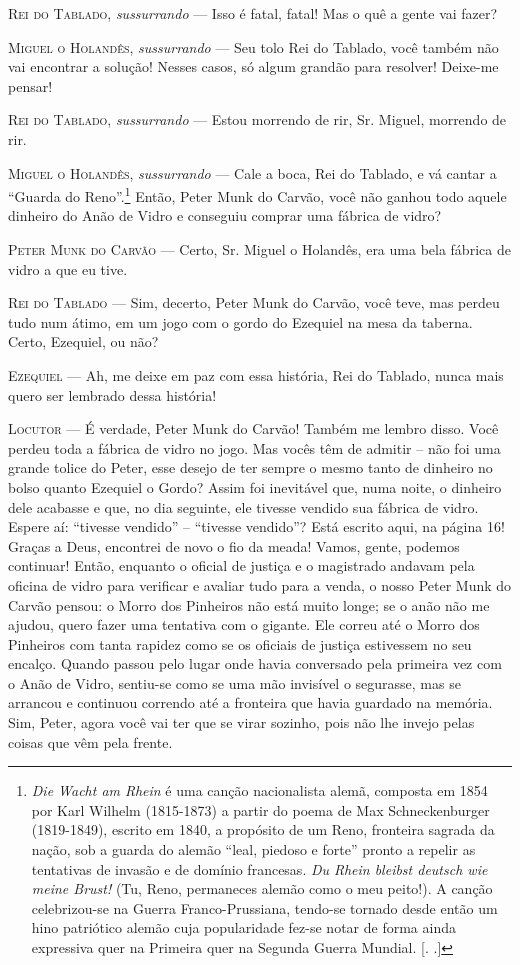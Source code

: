 \textsc{Rei do Tablado}, \emph{sussurrando} --- Isso é fatal, fatal! Mas o quê a
gente vai fazer?

\textsc{Miguel o Holandês}, \emph{sussurrando} --- Seu tolo Rei do Tablado, você
também não vai encontrar a solução! Nesses casos, só algum grandão para
resolver! Deixe-me pensar!

\textsc{Rei do Tablado}, \emph{sussurrando} --- Estou morrendo de rir, Sr. Miguel,
morrendo de rir.

\textsc{Miguel o Holandês}, \emph{sussurrando} --- Cale a boca, Rei do Tablado, e
vá cantar a ``Guarda do Reno''.\footnote{\emph{Die Wacht am Rhein} é uma
  canção nacionalista alemã, composta em 1854 por Karl Wilhelm
  (1815-1873) a partir do poema de Max Schneckenburger (1819-1849),
  escrito em 1840, a propósito de um Reno, fronteira sagrada da nação,
  sob a guarda do alemão ``leal, piedoso e forte'' pronto a repelir as
  tentativas de invasão e de domínio francesas. \emph{Du Rhein bleibst
  deutsch wie meine Brust!} (Tu, Reno, permaneces alemão como o meu
  peito!). A canção celebrizou-se na Guerra Franco-Prussiana, tendo-se
  tornado desde então um hino patriótico alemão cuja popularidade fez-se
  notar de forma ainda expressiva quer na Primeira quer na Segunda
  Guerra Mundial. [. .]} Então, Peter Munk do Carvão, você não
ganhou todo aquele dinheiro do Anão de Vidro e conseguiu comprar uma
fábrica de vidro?

\textsc{Peter Munk do Carvão} --- Certo, Sr. Miguel o Holandês, era uma bela
fábrica de vidro a que eu tive.

\textsc{Rei do Tablado} --- Sim, decerto, Peter Munk do Carvão, você teve, mas
perdeu tudo num átimo, em um jogo com o gordo do Ezequiel na mesa da
taberna. Certo, Ezequiel, ou não?

\textsc{Ezequiel} --- Ah, me deixe em paz com essa história, Rei do Tablado, nunca
mais quero ser lembrado dessa história!

\textsc{Locutor} --- É verdade, Peter Munk do Carvão! Também me lembro disso. Você
perdeu toda a fábrica de vidro no jogo. Mas vocês têm de admitir -- não
foi uma grande tolice do Peter, esse desejo de ter sempre o mesmo tanto
de dinheiro no bolso quanto Ezequiel o Gordo? Assim foi inevitável que,
numa noite, o dinheiro dele acabasse e que, no dia seguinte, ele tivesse
vendido sua fábrica de vidro. Espere aí: ``tivesse vendido'' --
``tivesse vendido''? Está escrito aqui, na página 16! Graças a Deus,
encontrei de novo o fio da meada! Vamos, gente, podemos continuar!
Então, enquanto o oficial de justiça e o magistrado andavam pela oficina
de vidro para verificar e avaliar tudo para a venda, o nosso Peter Munk
do Carvão pensou: o Morro dos Pinheiros não está muito longe; se o anão
não me ajudou, quero fazer uma tentativa com o gigante. Ele correu até o
Morro dos Pinheiros com tanta rapidez como se os oficiais de justiça
estivessem no seu encalço. Quando passou pelo lugar onde havia
conversado pela primeira vez com o Anão de Vidro, sentiu-se como se uma
mão invisível o segurasse, mas se arrancou e continuou correndo até a
fronteira que havia guardado na memória. Sim, Peter, agora você vai ter
que se virar sozinho, pois não lhe invejo pelas coisas que vêm pela
frente.

